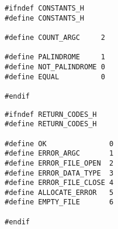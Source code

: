 \clearpage

\begin{center}
    \captionsetup{justification=raggedright,singlelinecheck=off}
    \begin{lstlisting}[label=lst:constants,caption=constants.h]
#ifndef CONSTANTS_H
#define CONSTANTS_H

#define COUNT_ARGC     2

#define PALINDROME     1
#define NOT_PALINDROME 0
#define EQUAL          0

#endif
\end{lstlisting}
\end{center}

\begin{center}
    \captionsetup{justification=raggedright,singlelinecheck=off}
    \begin{lstlisting}[label=lst:returncodes, caption=return\_codes.h]
#ifndef RETURN_CODES_H
#define RETURN_CODES_H

#define OK               0
#define ERROR_ARGC       1
#define ERROR_FILE_OPEN  2
#define ERROR_DATA_TYPE  3
#define ERROR_FILE_CLOSE 4
#define ALLOCATE_ERROR   5
#define EMPTY_FILE       6

#endif
\end{lstlisting}
\end{center}
